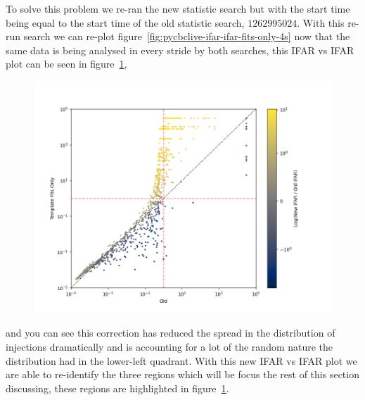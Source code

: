 To solve this problem we re-ran the new statistic search but with the start time being equal to the start time of the old statistic search, $1262995024$. With this re-run search we can re-plot figure~\ref{fig:pycbclive-ifar-ifar-fits-only-4s} now that the same data is being analysed in every stride by both searches, this IFAR vs IFAR plot can be seen in figure~\ref{fig:pycbclive-ifar-ifar-fits-only-0s},
%
\begin{figure}
       \centering
    \includegraphics[width=1.2\textwidth]{images/pycbclive/fits_only_0s_ifar_vs_ifar_log_ifar_diff.png}
    \caption{}
    \label{fig:pycbclive-ifar-ifar-fits-only-0s}
\end{figure}
%
and you can see this correction has reduced the spread in the distribution of injections dramatically and is accounting for a lot of the random nature the distribution had in the lower-left quadrant. With this new IFAR vs IFAR plot we are able to re-identify the three regions which will be focus the rest of this section discussing, these regions are highlighted in figure~\ref{fig:pycbclive-ifar-ifar-fits-only-0s}.
%
